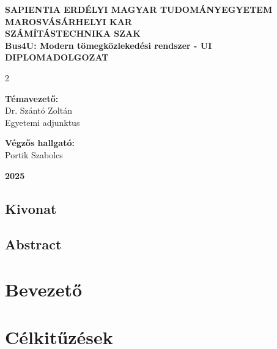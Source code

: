 \documentclass[12pt, a4paper, oneside]{report}             %
\begin{document}
\begin{titlepage}
  \center
  \fontsize{18}{22}\selectfont
  \textbf{SAPIENTIA ERDÉLYI MAGYAR TUDOMÁNYEGYETEM} \\
  \fontsize{16}{20}\selectfont
  \textbf{MAROSVÁSÁRHELYI KAR} \\
  \textbf{SZÁMÍTÁSTECHNIKA SZAK} \\
  \vspace{1.5in}
  \Huge
  \textbf{Bus4U: Modern tömegközlekedési rendszer - UI} \\
  \vspace{0.2in}
  \LARGE
  \textbf{DIPLOMADOLGOZAT} \\
  \vspace{1.5in}
  \Large
  \begin{multicols}{2}
    \begin{flushleft}
      \textbf{Témavezető:} \\
      Dr. Szántó Zoltán \\
      Egyetemi adjunktus
    \end{flushleft}
    \columnbreak
    \begin{flushright}
      \textbf{Végzős hallgató:} \\
      Portik Szabolcs
    \end{flushright}
  \end{multicols}
  \vspace{0.4in}
  \Huge
  \textbf{2025}
\end{titlepage}

\section*{Kivonat}


\section*{Abstract}


\tableofcontents

\listoffigures
\newpage

\chapter{Bevezető}


\chapter{Célkitűzések}

\end{document}
